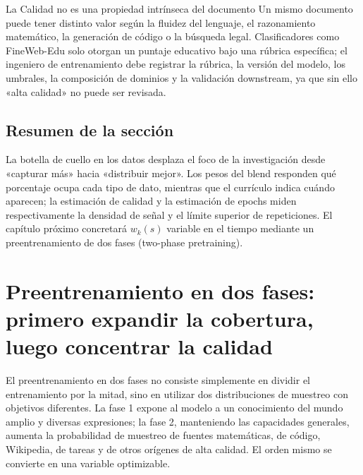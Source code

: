 \documentclass[a4paper]{article}
\begin{document}

\begin{warningbox}{La Calidad no es una propiedad intrínseca del documento}
Un mismo documento puede tener distinto valor según la fluidez del lenguaje, el razonamiento matemático, la generación de código o la búsqueda legal. Clasificadores como FineWeb-Edu solo otorgan un puntaje educativo bajo una rúbrica específica; el ingeniero de entrenamiento debe registrar la rúbrica, la versión del modelo, los umbrales, la composición de dominios y la validación downstream, ya que sin ello «alta calidad» no puede ser revisada.
\end{warningbox}

\subsection{Resumen de la sección}

La botella de cuello en los datos desplaza el foco de la investigación desde «capturar más» hacia «distribuir mejor». Los pesos del blend responden qué porcentaje ocupa cada tipo de dato, mientras que el currículo indica cuándo aparecen; la estimación de calidad y la estimación de epochs miden respectivamente la densidad de señal y el límite superior de repeticiones. El capítulo próximo concretará $w_k(s)$ variable en el tiempo mediante un preentrenamiento de dos fases (two-phase pretraining).


\section{Preentrenamiento en dos fases: primero expandir la cobertura, luego concentrar la calidad}

El preentrenamiento en dos fases no consiste simplemente en dividir el entrenamiento por la mitad, sino en utilizar dos distribuciones de muestreo con objetivos diferentes. La fase 1 expone al modelo a un conocimiento del mundo amplio y diversas expresiones; la fase 2, manteniendo las capacidades generales, aumenta la probabilidad de muestreo de fuentes matemáticas, de código, Wikipedia, de tareas y de otros orígenes de alta calidad. El orden mismo se convierte en una variable optimizable.
\end{document}
